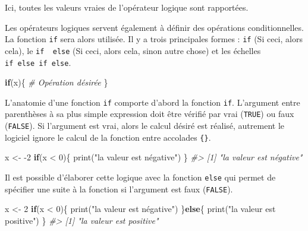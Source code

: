\documentclass[
]{book}
\newenvironment{Shaded}{}{}
\newcommand{\CommentTok}[1]{\textit{#1}}
\newcommand{\ControlFlowTok}[1]{\textbf{#1}}
\newcommand{\DecValTok}[1]{#1}
\newcommand{\FunctionTok}[1]{#1}
\newcommand{\NormalTok}[1]{#1}
\newcommand{\OtherTok}[1]{#1}
\newcommand{\SpecialCharTok}[1]{#1}
\newcommand{\StringTok}[1]{#1}
\begin{document}
Ici, toutes les valeurs vraies de l'opérateur logique sont rapportées.

Les opérateurs logiques servent également à définir des opérations conditionnelles. La fonction \texttt{if} sera alors utilisée. Il y a trois principales formes : \texttt{if} (Si ceci, alors cela), le \texttt{if\ \ else} (Si ceci, alors cela, sinon autre chose) et les échelles \texttt{if\ else\ if\ else}.

\begin{Shaded}
\begin{Highlighting}[]
\ControlFlowTok{if}\NormalTok{(x)\{}
  \CommentTok{\# Opération désirée}
\NormalTok{\}}
\end{Highlighting}
\end{Shaded}

L'anatomie d'une fonction \texttt{if} comporte d'abord la fonction \texttt{if}. L'argument entre parenthèses à sa plus simple expression doit être vérifié par vrai (\texttt{TRUE}) ou faux (\texttt{FALSE}). Si l'argument est vrai, alors le calcul désiré est réalisé, autrement le logiciel ignore le calcul de la fonction entre accolades \texttt{\{\}}.

\begin{Shaded}
\begin{Highlighting}[]
\NormalTok{x }\OtherTok{\textless{}{-}} \SpecialCharTok{{-}}\DecValTok{2}
\ControlFlowTok{if}\NormalTok{(x }\SpecialCharTok{\textless{}} \DecValTok{0}\NormalTok{)\{}
  \FunctionTok{print}\NormalTok{(}\StringTok{"la valeur est négative"}\NormalTok{)}
\NormalTok{\}}
\CommentTok{\#\textgreater{} [1] "la valeur est négative"}
\end{Highlighting}
\end{Shaded}

Il est possible d'élaborer cette logique avec la fonction \texttt{else} qui permet de spécifier une suite à la fonction si l'argument est faux (\texttt{FALSE}).

\begin{Shaded}
\begin{Highlighting}[]
\NormalTok{x }\OtherTok{\textless{}{-}} \DecValTok{2}
\ControlFlowTok{if}\NormalTok{(x }\SpecialCharTok{\textless{}} \DecValTok{0}\NormalTok{)\{}
  \FunctionTok{print}\NormalTok{(}\StringTok{"la valeur est négative"}\NormalTok{)}
\NormalTok{\}}\ControlFlowTok{else}\NormalTok{\{}
  \FunctionTok{print}\NormalTok{(}\StringTok{"la valeur est positive"}\NormalTok{)}
\NormalTok{\}}
\CommentTok{\#\textgreater{} [1] "la valeur est positive"}
\end{Highlighting}
\end{Shaded}
\end{document}
